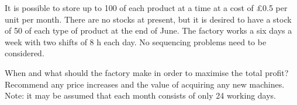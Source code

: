 It is possible to store up to 100 of each product at a time at a cost of £0.5
per unit per month. There are no stocks at present, but it is desired to have a
stock of 50 of each type of product at the end of June.
The factory works a six days a week with two shifts of 8 h each day.
No sequencing problems need to be considered.

When and what should the factory make in order to maximise the total profit?
Recommend any price increases and the value of acquiring any new machines.
Note: it may be assumed that each month consists of only 24 working days.
